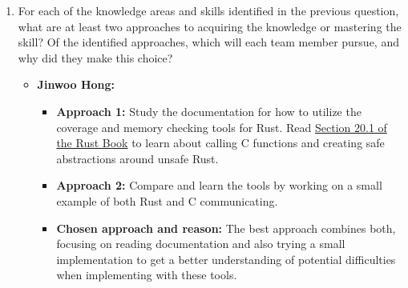 \documentclass[12pt, titlepage]{article}
\begin{document}
\begin{enumerate}
  \begin{itemize}
    \item \textbf{Jinwoo Hong:}
  Evaluating coverage and memory-checking tools for Rust, especially for areas involving ggml through an unsafe foreign function interface. This is important for testing as it requires figuring out what can and cannot be determined correctness-wise in this area.
    \item \textbf{Gary Qin:}
  Designing experiments to determine model capacity, max concurrent requests, and output quality and compare with past baselines, while also configuring various model settings and device configurations.
    \item \textbf{Matthew Nesbitt:}
  Building CI workflows across Linux, Windows, and macOS operating systems, while separating automated CI tests from those that require real manual hardware configurations.
    \item \textbf{Colin Chambachan:}
  Implementing various fixtures and fault injection tests that can reproduce failures in the distributed system while keeping these tests automated in the CI.
    \item \textbf{Ethan Walsh:}
  Ensuring tests are traceable to requirements and being able to audit and inspect missed acceptance criteria, infeasible tests, and any other changes that require tests to be updated.
  \end{itemize}

  \item For each of the knowledge areas and skills identified in the previous
  question, what are at least two approaches to acquiring the knowledge or
  mastering the skill?  Of the identified approaches, which will each team
  member pursue, and why did they make this choice?

  \begin{itemize}
    \item \textbf{Jinwoo Hong:}
    \begin{itemize}
      \item \textbf{Approach 1:}
      Study the documentation for how to utilize the coverage and memory checking tools for Rust. Read \href{https://doc.rust-lang.org/book/ch20-01-unsafe-rust.html}{Section 20.1 of the Rust Book} to learn about calling C functions and creating safe abstractions around unsafe Rust.
      \item \textbf{Approach 2:}
      Compare and learn the tools by working on a small example of both Rust and C communicating.
      \item \textbf{Chosen approach and reason:}
      The best approach combines both, focusing on reading documentation and also trying a small implementation to get a better understanding of potential difficulties when implementing with these tools.
    \end{itemize}


\end{itemize}
\end{enumerate}
\end{document}
